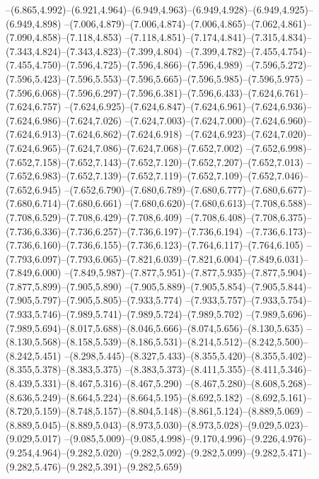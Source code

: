   --(6.865,4.992)--(6.921,4.964)--(6.949,4.963)--(6.949,4.928)--(6.949,4.925)--(6.949,4.898)%
  --(7.006,4.879)--(7.006,4.874)--(7.006,4.865)--(7.062,4.861)--(7.090,4.858)--(7.118,4.853)%
  --(7.118,4.851)--(7.174,4.841)--(7.315,4.834)--(7.343,4.824)--(7.343,4.823)--(7.399,4.804)%
  --(7.399,4.782)--(7.455,4.754)--(7.455,4.750)--(7.596,4.725)--(7.596,4.866)--(7.596,4.989)%
  --(7.596,5.272)--(7.596,5.423)--(7.596,5.553)--(7.596,5.665)--(7.596,5.985)--(7.596,5.975)%
  --(7.596,6.068)--(7.596,6.297)--(7.596,6.381)--(7.596,6.433)--(7.624,6.761)--(7.624,6.757)%
  --(7.624,6.925)--(7.624,6.847)--(7.624,6.961)--(7.624,6.936)--(7.624,6.986)--(7.624,7.026)%
  --(7.624,7.003)--(7.624,7.000)--(7.624,6.960)--(7.624,6.913)--(7.624,6.862)--(7.624,6.918)%
  --(7.624,6.923)--(7.624,7.020)--(7.624,6.965)--(7.624,7.086)--(7.624,7.068)--(7.652,7.002)%
  --(7.652,6.998)--(7.652,7.158)--(7.652,7.143)--(7.652,7.120)--(7.652,7.207)--(7.652,7.013)%
  --(7.652,6.983)--(7.652,7.139)--(7.652,7.119)--(7.652,7.109)--(7.652,7.046)--(7.652,6.945)%
  --(7.652,6.790)--(7.680,6.789)--(7.680,6.777)--(7.680,6.677)--(7.680,6.714)--(7.680,6.661)%
  --(7.680,6.620)--(7.680,6.613)--(7.708,6.588)--(7.708,6.529)--(7.708,6.429)--(7.708,6.409)%
  --(7.708,6.408)--(7.708,6.375)--(7.736,6.336)--(7.736,6.257)--(7.736,6.197)--(7.736,6.194)%
  --(7.736,6.173)--(7.736,6.160)--(7.736,6.155)--(7.736,6.123)--(7.764,6.117)--(7.764,6.105)%
  --(7.793,6.097)--(7.793,6.065)--(7.821,6.039)--(7.821,6.004)--(7.849,6.031)--(7.849,6.000)%
  --(7.849,5.987)--(7.877,5.951)--(7.877,5.935)--(7.877,5.904)--(7.877,5.899)--(7.905,5.890)%
  --(7.905,5.889)--(7.905,5.854)--(7.905,5.844)--(7.905,5.797)--(7.905,5.805)--(7.933,5.774)%
  --(7.933,5.757)--(7.933,5.754)--(7.933,5.746)--(7.989,5.741)--(7.989,5.724)--(7.989,5.702)%
  --(7.989,5.696)--(7.989,5.694)--(8.017,5.688)--(8.046,5.666)--(8.074,5.656)--(8.130,5.635)%
  --(8.130,5.568)--(8.158,5.539)--(8.186,5.531)--(8.214,5.512)--(8.242,5.500)--(8.242,5.451)%
  --(8.298,5.445)--(8.327,5.433)--(8.355,5.420)--(8.355,5.402)--(8.355,5.378)--(8.383,5.375)%
  --(8.383,5.373)--(8.411,5.355)--(8.411,5.346)--(8.439,5.331)--(8.467,5.316)--(8.467,5.290)%
  --(8.467,5.280)--(8.608,5.268)--(8.636,5.249)--(8.664,5.224)--(8.664,5.195)--(8.692,5.182)%
  --(8.692,5.161)--(8.720,5.159)--(8.748,5.157)--(8.804,5.148)--(8.861,5.124)--(8.889,5.069)%
  --(8.889,5.045)--(8.889,5.043)--(8.973,5.030)--(8.973,5.028)--(9.029,5.023)--(9.029,5.017)%
  --(9.085,5.009)--(9.085,4.998)--(9.170,4.996)--(9.226,4.976)--(9.254,4.964)--(9.282,5.020)%
  --(9.282,5.092)--(9.282,5.099)--(9.282,5.471)--(9.282,5.476)--(9.282,5.391)--(9.282,5.659)%
